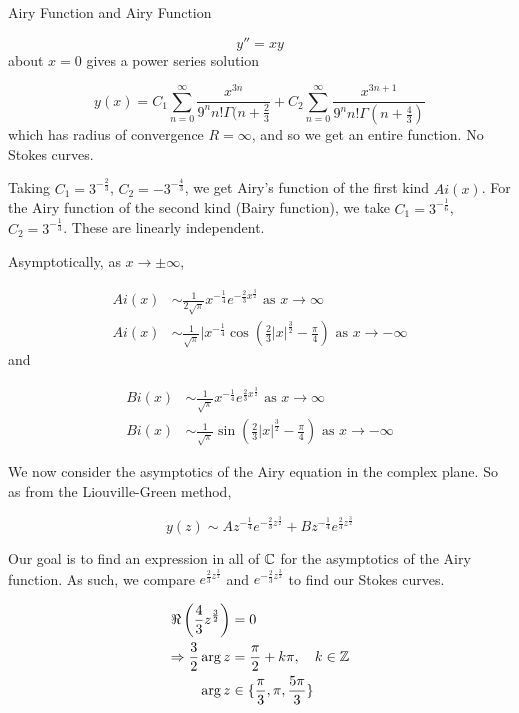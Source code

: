 \documentclass[a4paper]{article}
\begin{document}
\begin{eg} Airy Function and Airy Function

	\[
	y'' = xy
	\] about $x=0$ gives a power series solution

	\[
		y(x) = C_1 \sum_{n=0}^{\infty} \frac{x^{3n}}{9^{n}n! \Gamma(n + \frac{2}{3}} + C_2\sum_{n=0}^{\infty} \frac{x^{3n+1}}{9^{n} n! \Gamma(n+\frac{4}{3})}
	\] which has radius of convergence $R = \infty$, and so we get an entire function. No Stokes curves. 

	Taking $C_1 = 3^{-\frac{2}{3}}$, $C_2 = -3^{-\frac{4}{3}}$, we get Airy's function of the first kind $Ai(x)$. For the Airy function of the second kind (Bairy function), we take $C_1 = 3^{-\frac{1}{6}}$, $C_2 = 3^{-\frac{1}{3}}$. These are linearly independent. 

	Asymptotically, as $x \to \pm \infty$,

	\begin{align*}
		Ai(x) &\sim  \frac{1}{2\sqrt{\pi} } x^{-\frac{1}{4}} e^{-\frac{2}{3}x^{\frac{3}{2}}} \text{ as } x\to \infty \\
		Ai(x) &\sim  \frac{1}{\sqrt{\pi} } |x^{-\frac{1}{4}} \cos\left( \frac{2}{3} |x|^{\frac{3}{2}} - \frac{\pi}{4} \right) \text{ as } x \to -\infty
	\end{align*} and

	\begin{align*}
		Bi(x) &\sim \frac{1}{\sqrt{\pi} } x^{-\frac{1}{4}} e^{\frac{2}{3}x^{\frac{3}{2}}} \text{ as } x \to \infty \\
		Bi(x) &\sim \frac{1}{\sqrt{\pi} } \sin\left( \frac{2}{3} |x|^{\frac{3}{2}} - \frac{\pi}{4} \right) \text{ as } x \to  -\infty
	\end{align*}

	We now consider the asymptotics of the Airy equation in the complex plane. So as from the Liouville-Green method,

	\[
		y(z) \sim  Az^{-\frac{1}{4}} e^{-\frac{2}{3}z^{\frac{3}{2}}} + B z^{-\frac{1}{4}}e^{\frac{2}{3} z^{\frac{3}{2}}}
	\] 

	Our goal is to find an expression in all of $\mathbb{C}$ for the asymptotics of the Airy function. As such, we compare $e^{\frac{2}{3}z^{\frac{3}{2}}}$ and $e^{-\frac{2}{3}z^{\frac{3}{2}}}$ to find our Stokes curves.

	\begin{align*}
		\Re \left( \frac{4}{3}z^{\frac{3}{2}} \right) &= 0 \\
		\Rightarrow \frac{3}{2} \arg z &= \frac{\pi}{2} + k\pi, \quad k \in \mathbb{Z} \\
		\arg z &\in \{\frac{\pi}{3}, \pi, \frac{5\pi}{3}\} 
	\end{align*}


\end{eg}
\end{document}
